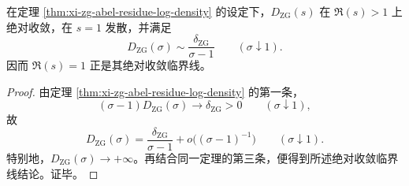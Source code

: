 \begin{corollary}[ZG 的 Dirichlet 级数的绝对收敛临界线恰为 \texorpdfstring{$\Re(s)=1$}{Re(s)=1}]\label{cor:xi-zg-absolute-convergence-critical-line}
在定理 \ref{thm:xi-zg-abel-residue-log-density} 的设定下，\(D_{\mathrm{ZG}}(s)\) 在 \(\Re(s)>1\) 上绝对收敛，在 \(s=1\) 发散，并满足
\[
D_{\mathrm{ZG}}(\sigma)\sim \frac{\delta_{\mathrm{ZG}}}{\sigma-1}
\qquad (\sigma\downarrow 1).
\]
因而 \(\Re(s)=1\) 正是其绝对收敛临界线。
\end{corollary}
\begin{proof}
由定理 \ref{thm:xi-zg-abel-residue-log-density} 的第一条，
\[
(\sigma-1)D_{\mathrm{ZG}}(\sigma)\longrightarrow \delta_{\mathrm{ZG}}>0
\qquad (\sigma\downarrow 1),
\]
故
\[
D_{\mathrm{ZG}}(\sigma)
=
\frac{\delta_{\mathrm{ZG}}}{\sigma-1}
+o\!\bigl((\sigma-1)^{-1}\bigr)
\qquad (\sigma\downarrow 1).
\]
特别地，\(D_{\mathrm{ZG}}(\sigma)\to+\infty\)。再结合同一定理的第三条，便得到所述绝对收敛临界线结论。证毕。
\end{proof}

